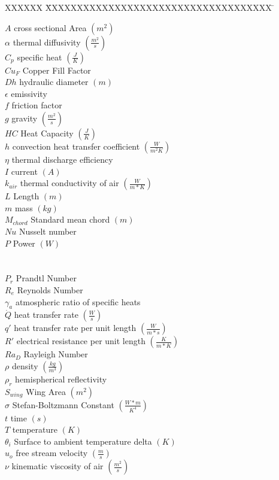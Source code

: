 \documentclass[]{aiaa-tc}%
\begin{document}
\begin{multicols}{2}
 \begin{tabbing}
  XXXXXX \= XXXXXXXXXXXXXXXXXXXXXXXXXXXXXXXXXXXX \= \kill %
  
  $A$ \> cross sectional Area $(m^{2})$ \\
  $\alpha$ \> thermal diffusivity $(\frac{m^{2}}{s})$\\
  $C_p$ \> specific heat $(\frac{J}{K})$\\
  $Cu_F$ \> Copper Fill Factor\\
  $Dh$ \> hydraulic diameter $(m)$\\
  $\epsilon$ \> emissivity \\
  $f$ \> friction factor \\
  $g$ \> gravity $(\frac{m^{2}}{s})$\\
  $HC$ \> Heat Capacity $(\frac{J}{K})$\\
  $h$ \> convection heat transfer coefficient $(\frac{W}{m^{2}K})$ \\
  $\eta$ \> thermal discharge efficiency \\
  $I$ \> current $(A)$\\
  $k_{air}$ \> thermal conductivity of air $(\frac{W}{m*K})$\\
  $L$ \> Length $(m)$\\
  $m$ \> mass $(kg)$\\
  $M_{chord}$ \> Standard mean chord $(m)$\\
  $Nu$ \> Nusselt number \\
  $P$ \> Power $(W)$ \\
  \\
  \\
  $P_{r}$ \> Prandtl Number \\
  $R_{e}$ \> Reynolds Number \\
  $\gamma_a$ \> atmospheric ratio of specific heats \\
  $\dot{Q}$ \> heat transfer rate $(\frac{W}{s})$ \\
  $q'$ \> heat transfer rate per unit length $(\frac{W}{m*s})$\\
  $R'$ \> electrical resistance per unit length $(\frac{K}{m*K})$\\
  $Ra_D$ \> Rayleigh Number \\
  $\rho$ \> density $(\frac{kg}{m^{3}})$\\
  $\rho_{r}$ \> hemispherical reflectivity\\
  $S_{wing}$ \> Wing Area $(m^{2})$ \\
  $\sigma$ \> Stefan-Boltzmann Constant $(\frac{W*m}{K^{4}})$ \\
  $t$ \> time $(s)$\\
  $T$ \> temperature $(K)$\\
  $\theta_i$ \> Surface to ambient temperature delta $(K)$\\
  $u_{o}$ \> free stream velocity $(\frac{m}{s})$\\
  $\nu$ \> kinematic viscosity of air $(\frac{m^{2}}{s})$\\

 \end{tabbing}
\end{multicols}
\end{document}
